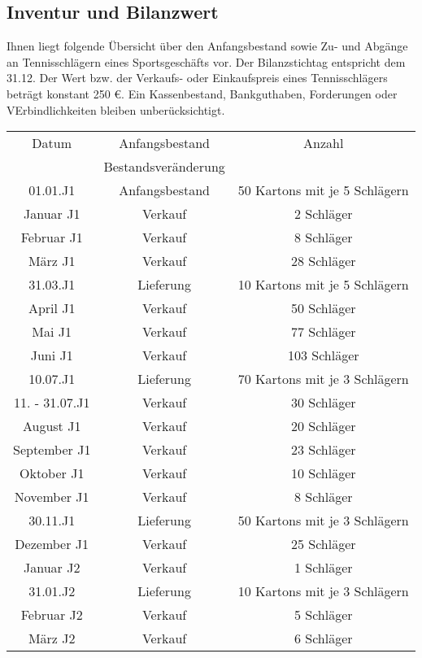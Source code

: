 \documentclass[paper=a4, fontsize=11pt]{scrartcl}
\numberwithin{equation}{section}
\numberwithin{figure}{section}
\numberwithin{table}{section}
\begin{document}
\subsection{Inventur und Bilanzwert}
Ihnen liegt folgende Übersicht über den Anfangsbestand sowie Zu- und Abgänge an Tennisschlägern eines Sportsgeschäfts vor. Der Bilanzstichtag entspricht dem 31.12. Der Wert bzw. der Verkaufs- oder Einkaufspreis eines Tennisschlägers beträgt konstant 250 €. Ein Kassenbestand, Bankguthaben, Forderungen oder VErbindlichkeiten bleiben unberücksichtigt. \\

\begin{tabular}{c|c|c}
\hline
Datum & Anfangsbestand & Anzahl \\
          & Bestandsveränderung & \\
\hline
 01.01.J1 & Anfangsbestand & 50 Kartons mit je 5 Schlägern \\
 \hline
 Januar J1 & Verkauf & 2 Schläger \\
 \hline  
  Februar J1 & Verkauf & 8 Schläger \\
 \hline   
  März J1 & Verkauf & 28 Schläger \\
 \hline   
  31.03.J1 & Lieferung & 10 Kartons mit je 5 Schlägern \\
 \hline   
  April J1 & Verkauf & 50 Schläger \\
 \hline            
  Mai J1 & Verkauf & 77 Schläger \\
 \hline   
  Juni J1 & Verkauf & 103 Schläger \\
 \hline   
  10.07.J1 & Lieferung & 70 Kartons mit je 3 Schlägern \\
 \hline   
  11. - 31.07.J1 & Verkauf & 30 Schläger \\
 \hline   
  August J1 & Verkauf & 20 Schläger \\
 \hline  
  September J1 & Verkauf & 23 Schläger \\
 \hline   
  Oktober J1 & Verkauf & 10 Schläger \\
 \hline   
  November J1 & Verkauf & 8 Schläger \\
 \hline   
  30.11.J1 & Lieferung & 50 Kartons mit je 3 Schlägern \\
 \hline   
  Dezember J1 & Verkauf & 25 Schläger \\
 \hline  
  Januar J2 & Verkauf & 1 Schläger \\
 \hline   
  31.01.J2 & Lieferung & 10 Kartons mit je 3 Schlägern \\
 \hline   
  Februar J2 & Verkauf & 5 Schläger \\
 \hline   
  März J2 & Verkauf & 6 Schläger \\
 \hline   
\end{tabular} 
\\
\end{document}

